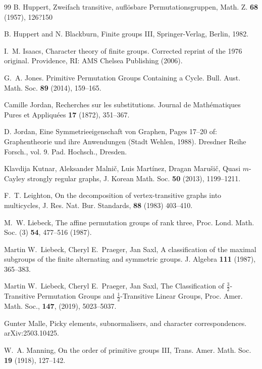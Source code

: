 \documentclass{article}
\theoremstyle{remark}
\theoremstyle{definition}
\begin{document}
\begin{thebibliography}{99}
B. Huppert, Zweifach transitive,  aufl\"{o}sbare Permutationsgruppen,
Math. Z. {\bf 68} (1957), 126?150

B. Huppert and N. Blackburn, Finite groups III, Springer-Verlag, Berlin, 1982.

I.~M. Isaacs, Character theory of finite groups. Corrected reprint of the 1976 original. Providence, RI: AMS Chelsea Publishing (2006).
 
G.~A. Jones.
Primitive Permutation Groups Containing a Cycle.
Bull. Aust. Math. Soc. {\bf 89} (2014), 159--165.

Camille Jordan, Recherches sur les substitutions. Journal de Math{\'e}matiques Pures et Appliqu{\' e}es {\bf 17} (1872), 351--367.




D. Jordan, Eine Symmetrieeigenschaft von Graphen, Pages 17--20 of:
Graphentheorie und ihre Anwendungen (Stadt Wehlen, 1988). Dresdner Reihe Forsch., vol. 9. Pad. Hochsch., Dresden.

Klavdija Kutnar, Aleksander Malni\v{c}, Luis Mart\'{i}nez,  Dragan Maru\v{s}i\v{c},
Quasi {$m$}-Cayley strongly regular graphs,
J. Korean Math. Soc. \textbf{50} (2013), 1199--1211.

F.~T. Leighton,  On the decomposition of vertex-transitive graphs into multicycles,
J. Res. Nat. Bur. Standards, {\bf 88} (1983) 403--410.

M.~W. Liebeck, 
The  affine permutation groups of rank three,
Proc. Lond. Math. Soc. (3) {\bf 54}, 477--516 (1987).

Martin W.~Liebeck,  Cheryl E.~Praeger, Jan Saxl,
A classification of the maximal subgroups of the finite alternating and symmetric groups. J. Algebra \textbf{111} (1987), 365--383.

Martin W.~Liebeck,  Cheryl E.~Praeger, Jan Saxl,
The Classification of {$\frac{3}{2}$}-Transitive Permutation Groups and {$\frac{1}{2}$}-Transitive Linear Groups,
Proc. Amer. Math. Soc., \textbf{147}, (2019),  5023--5037.


Gunter Malle, Picky elements, subnormalisers, and character correspondences.  arXiv:2503.10425.




W.~A. Manning, On the order of primitive groups III, Trans. Amer. Math. Soc. \textbf{19}  (1918), 127--142.


\end{thebibliography}
\end{document}
